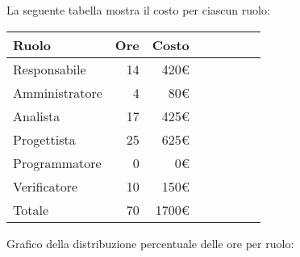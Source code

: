 La seguente tabella mostra il costo per ciascun ruolo:
\begin{table}[H]
    \begin{tabularx}{\linewidth}{X|rrrrrrr}
    \rowcolor{gray!30}Ruolo & Ore & Costo \\
    \hline
    Responsabile                            & 14 & 420€ \\
    \rowcolor{gray!10}Amministratore        & 4 & 80€ \\
    Analista                                & 17 & 425€ \\
    \rowcolor{gray!10}Progettista           & 25 & 625€ \\
    Programmatore                           & 0 & 0€ \\
    \rowcolor{gray!10}Verificatore          & 10 & 150€ \\
    \hline Totale                           & 70 & 1700€ \\ 
    \end{tabularx}
\end{table}

Grafico della distribuzione percentuale delle ore per ruolo:
\begin{center}
\end{center}

